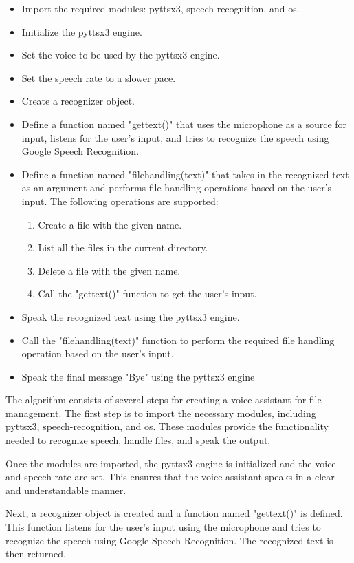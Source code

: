 \documentclass[conference]{IEEEtran}
\begin{document}
\begin{itemize}

\item Import the required modules: pyttsx3, speech-recognition, and os.
\item Initialize the pyttsx3 engine.
\item Set the voice to be used by the pyttsx3 engine.
\item Set the speech rate to a slower pace.
\item Create a recognizer object.
\item Define a function named "gettext()" that uses the microphone as a source for input, listens for the user's input, and tries to recognize the speech using Google Speech Recognition.
\item  Define a function named "filehandling(text)" that takes in the recognized text as an argument and performs file handling operations based on the user's input. The following operations are supported:
\begin{enumerate}
\item Create a file with the given name.
\item List all the files in the current directory.
\item Delete a file with the given name.
\item Call the "gettext()" function to get the user's input.
\end{enumerate}
\item  Speak the recognized text using the pyttsx3 engine.
\item  Call the "filehandling(text)" function to perform the required file handling operation based on the user's input.
\item  Speak the final message "Bye" using the pyttsx3 engine
\end{itemize}

The algorithm consists of several steps for creating a voice assistant for file management. The first step is to import the necessary modules, including pyttsx3, speech-recognition, and os. These modules provide the functionality needed to recognize speech, handle files, and speak the output.

\par Once the modules are imported, the pyttsx3 engine is initialized and the voice and speech rate are set. This ensures that the voice assistant speaks in a clear and understandable manner.

\par Next, a recognizer object is created and a function named "gettext()" is defined. This function listens for the user's input using the microphone and tries to recognize the speech using Google Speech Recognition. The recognized text is then returned.
\end{document}
